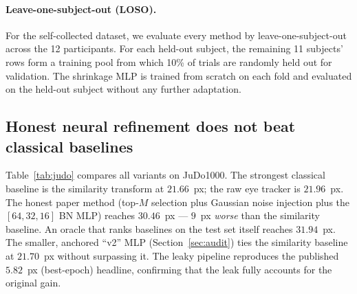 \paragraph{Leave-one-subject-out (LOSO).}
For the self-collected dataset, we evaluate every method by
leave-one-subject-out across the 12 participants. For each held-out
subject, the remaining 11 subjects' rows form a training pool from
which 10\% of trials are randomly held out for validation.
The shrinkage MLP is trained from scratch on each fold and evaluated on
the held-out subject without any further adaptation.

\subsection{Honest neural refinement does not beat classical baselines}

Table~\ref{tab:judo} compares all variants on JuDo1000. The strongest
classical baseline is the similarity transform at $21.66$~px; the raw
eye tracker is $21.96$~px. The honest paper method (top-$M$ selection
plus Gaussian noise injection plus the $[64,32,16]$ BN MLP) reaches
$30.46$~px --- $9$~px \emph{worse} than the similarity baseline. An
oracle that ranks baselines on the test set itself reaches $31.94$~px.
The smaller, anchored ``v2'' MLP (Section~\ref{sec:audit}) ties the
similarity baseline at $21.70$~px without surpassing it. The leaky
pipeline reproduces the published $5.82$~px (best-epoch) headline,
confirming that the leak fully accounts for the original gain.


